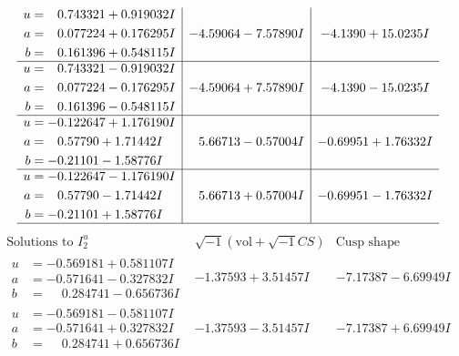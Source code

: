 \documentclass[1p]{elsarticle_modified}
\theoremstyle{definition}
\newcommand{\I}{\sqrt{-1}}
\begin{document}
$$\begin{array}{c|c|c}
\begin{aligned}
u &= \phantom{-}0.743321 + 0.919032 I \\
a &= \phantom{-}0.077224 + 0.176295 I \\
b &= \phantom{-}0.161396 + 0.548115 I\end{aligned}
 & -4.59064 - 7.57890 I & -4.1390 + 15.0235 I \\ \hline\begin{aligned}
u &= \phantom{-}0.743321 - 0.919032 I \\
a &= \phantom{-}0.077224 - 0.176295 I \\
b &= \phantom{-}0.161396 - 0.548115 I\end{aligned}
 & -4.59064 + 7.57890 I & -4.1390 - 15.0235 I \\ \hline\begin{aligned}
u &= -0.122647 + 1.176190 I \\
a &= \phantom{-}0.57790 + 1.71442 I \\
b &= -0.21101 - 1.58776 I\end{aligned}
 & \phantom{-}5.66713 - 0.57004 I & -0.69951 + 1.76332 I \\ \hline\begin{aligned}
u &= -0.122647 - 1.176190 I \\
a &= \phantom{-}0.57790 - 1.71442 I \\
b &= -0.21101 + 1.58776 I\end{aligned}
 & \phantom{-}5.66713 + 0.57004 I & -0.69951 - 1.76332 I\\
 \hline 
 \end{array}$$\newpage$$\begin{array}{c|c|c}  
\text{Solutions to }I^u_{2}& \I (\text{vol} + \sqrt{-1}CS) & \text{Cusp shape}\\
 \hline 
\begin{aligned}
u &= -0.569181 + 0.581107 I \\
a &= -0.571641 - 0.327832 I \\
b &= \phantom{-}0.284741 - 0.656736 I\end{aligned}
 & -1.37593 + 3.51457 I & -7.17387 - 6.69949 I \\ \hline\begin{aligned}
u &= -0.569181 - 0.581107 I \\
a &= -0.571641 + 0.327832 I \\
b &= \phantom{-}0.284741 + 0.656736 I\end{aligned}
 & -1.37593 - 3.51457 I & -7.17387 + 6.69949 I \\ \hline\begin{aligned}

\end{aligned}
\end{array}$$
\end{document}
